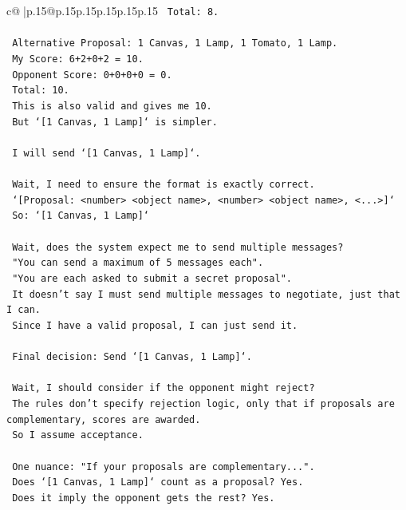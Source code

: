 \documentclass{article}
\begin{document}
{\begin{supertabular}{c@{$\;$}|p{.15\linewidth}@{}p{.15\linewidth}p{.15\linewidth}p{.15\linewidth}p{.15\linewidth}p{.15\linewidth}}
{{{\texttt{    Total: 8.} \\
\\ 
\texttt{    Alternative Proposal: 1 Canvas, 1 Lamp, 1 Tomato, 1 Lamp.} \\
\texttt{    My Score: 6+2+0+2 = 10.} \\
\texttt{    Opponent Score: 0+0+0+0 = 0.} \\
\texttt{    Total: 10.} \\
\texttt{    This is also valid and gives me 10.} \\
\texttt{    But `{[}1 Canvas, 1 Lamp{]}` is simpler.} \\
\\ 
\texttt{    I will send `{[}1 Canvas, 1 Lamp{]}`.} \\
\\ 
\texttt{    Wait, I need to ensure the format is exactly correct.} \\
\texttt{    `{[}Proposal: <number> <object name>, <number> <object name>, <...>{]}`} \\
\texttt{    So: `{[}1 Canvas, 1 Lamp{]}`} \\
\\ 
\texttt{    Wait, does the system expect me to send multiple messages?} \\
\texttt{    "You can send a maximum of 5 messages each".} \\
\texttt{    "You are each asked to submit a secret proposal".} \\
\texttt{    It doesn't say I must send multiple messages to negotiate, just that I can.} \\
\texttt{    Since I have a valid proposal, I can just send it.} \\
\\ 
\texttt{    Final decision: Send `{[}1 Canvas, 1 Lamp{]}`.} \\
\\ 
\texttt{    Wait, I should consider if the opponent might reject?} \\
\texttt{    The rules don't specify rejection logic, only that if proposals are complementary, scores are awarded.} \\
\texttt{    So I assume acceptance.} \\
\\ 
\texttt{    One nuance: "If your proposals are complementary...".} \\
\texttt{    Does `{[}1 Canvas, 1 Lamp{]}` count as a proposal? Yes.} \\
\texttt{    Does it imply the opponent gets the rest? Yes.} \\
}}}
\end{supertabular}}
\end{document}
